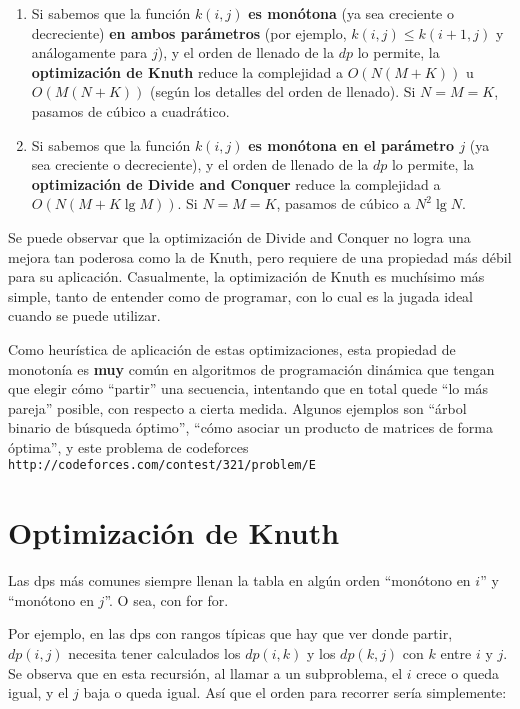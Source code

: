 \documentclass{article}
\def\lg{\mathop{\mathrm {lg}}\nolimits}
\begin{document}
\begin{enumerate}
    \item Si sabemos que la función $k(i,j)$ \textbf{es monótona} (ya sea creciente o decreciente) \textbf{en ambos parámetros} (por ejemplo, $k(i,j) \leq k(i+1,j)$ y análogamente para $j$), y el orden de llenado de la $dp$ lo permite,
           la \textbf{optimización de Knuth} reduce la complejidad a $O(N(M+K))$ u $O(M(N+K))$ (según los detalles del orden de llenado). Si $N=M=K$, pasamos de cúbico
           a cuadrático.
    \item Si sabemos que la función $k(i,j)$ \textbf{es monótona en el parámetro $j$} (ya sea creciente o decreciente), y el orden de llenado de la $dp$ lo permite, la
          \textbf{optimización de Divide and Conquer} reduce la complejidad a $O(N(M+K\lg M))$. Si $N=M=K$, pasamos de cúbico a $N^2 \lg N$.
\end{enumerate}

Se puede observar que la optimización de Divide and Conquer no logra una mejora tan poderosa como la de Knuth, pero requiere de una propiedad más débil para su aplicación. Casualmente, la optimización de Knuth es muchísimo más simple,
tanto de entender como de programar, con lo cual es la jugada ideal cuando se puede utilizar.

Como heurística de aplicación de estas optimizaciones, esta propiedad de monotonía es \textbf{muy} común en algoritmos de programación dinámica que tengan que elegir cómo ``partir'' una secuencia, intentando
que en total quede ``lo más pareja'' posible, con respecto a cierta medida. Algunos ejemplos son ``árbol binario de búsqueda óptimo'', ``cómo asociar un producto de matrices de forma óptima'', y este problema
de codeforces \texttt{http://codeforces.com/contest/321/problem/E}

\section{Optimización de Knuth}

Las dps más comunes siempre llenan la tabla en algún orden ``monótono en $i$'' y ``monótono en $j$''. O sea, con for for.

Por ejemplo, en las dps con rangos típicas que hay que ver donde partir, $dp(i,j)$ necesita tener calculados los $dp(i,k)$ y los $dp(k,j)$ con $k$ entre $i$ y $j$.
Se observa que en esta recursión, al llamar a un subproblema, el $i$ crece o queda igual, y el $j$ baja o queda igual. Así que el orden para recorrer sería simplemente:
\end{document}
